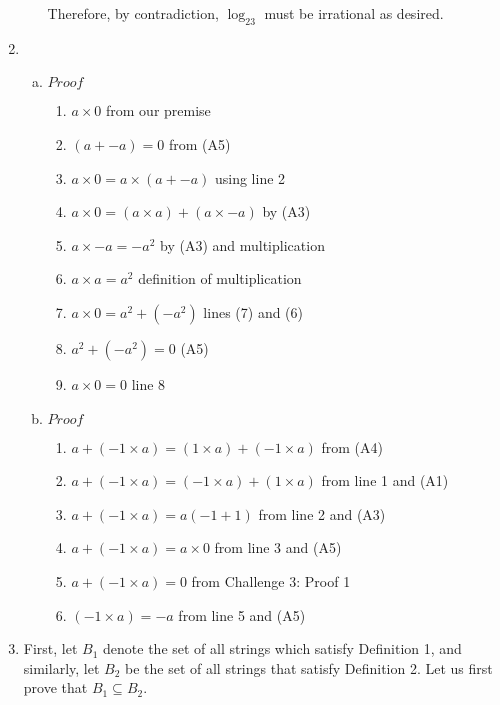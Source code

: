 \documentclass[11pt]{article}
\begin{document}
\begin{enumerate}
\begin{enumerate}[(a)]
		Therefore, by contradiction, $\log_23$ must be irrational as desired.
	 \end{enumerate}
	 \item \begin{enumerate}[(a)]
		 \item $Proof$
		 \begin{enumerate}[(1)]
			 \item $a \times 0$ from our premise\\ 
    	\item $(a + -a )= 0$ from (A5)\\
   		\item $a \times 0 = a \times (a + -a)$ using line 2\\
    	\item $a \times 0 = (a\times a) + (a \times -a)$ by (A3)\\
    \item $a\times -a = -a^2$ by (A3) and multiplication\\
    \item $a \times a = a^2$ definition of multiplication\\
    \item $a \times 0 = a^2 + (-a^2)$ lines (7) and (6)\\
    \item $a^2 + (-a^2) = 0$ (A5)\\
    \item $a \times 0 = 0$ line 8
		 \end{enumerate} 
		 \item $Proof$ 
   \begin{enumerate}[(1)]
	   \item $a +  (-1 \times a) = (1 \times a) + (-1 \times a)$ from (A4)
    \item $a +  (-1 \times a) = (-1 \times a) + (1 \times a)$ from line 1 and (A1)
    \item $a + (-1 \times a) = a (-1 + 1)$ from line 2 and (A3)
    \item $a + (-1 \times a) = a \times 0$ from line 3 and (A5)
    \item $a + (-1 \times a) = 0$ from Challenge 3: Proof 1
    \item $(-1 \times a) = -a$ from line 5 and (A5)
   \end{enumerate}
	 \end{enumerate}
	 \item First, let $B_1$ denote the set of all strings which satisfy Definition 1, and similarly, let $B_2$ be the set of all strings that satisfy Definition 2. Let us first prove that $B_1 \subseteq B_2$.\\\\

\end{enumerate}
\end{document}
